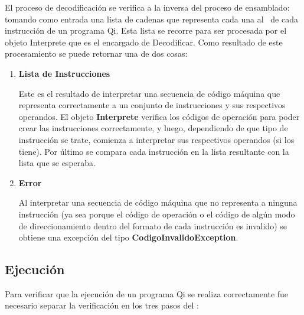 El proceso de decodificación se verifica a la inversa del proceso de ensamblado: tomando como entrada una lista de cadenas que representa cada una al \codmaq\ de cada instrucción de un programa Qi. Esta lista se recorre para ser procesada por el objeto Interprete que es el encargado de Decodificar. Como resultado de este procesamiento se puede retornar una de dos cosas:
 
\begin{enumerate}
\item \textbf{Lista de Instrucciones} 

Este es el resultado de interpretar una secuencia de código máquina que representa correctamente a un conjunto de instrucciones y sus respectivos operandos. El objeto \textbf{Interprete} verifica los códigos de operación para poder crear las instrucciones correctamente, y luego, dependiendo de que tipo de instrucción se trate, comienza a interpretar sus respectivos operandos (si los tiene).
Por último se compara cada instrucción en la lista resultante con la lista que se esperaba.

\item\textbf{Error}

Al interpretar una secuencia de código máquina que no representa a ninguna instrucción (ya sea porque el código de operación o el código de algún modo de direccionamiento dentro del formato de cada instrucción es invalido) se obtiene una excepción del tipo \textbf{CodigoInvalidoException}.   
\end{enumerate}

\subsection{Ejecución}

Para verificar que la ejecución de un programa Qi se realiza correctamente fue necesario separar la verificación en los tres pasos del \ciclo:


